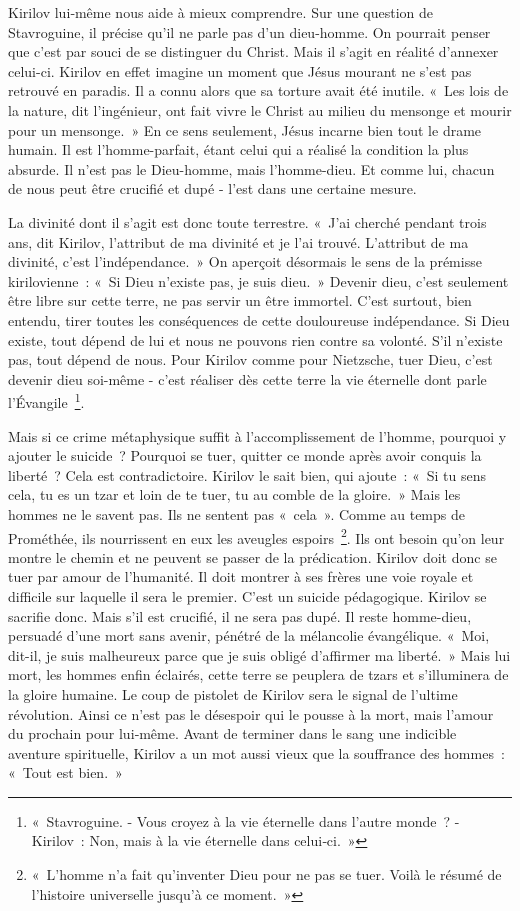 \documentclass{book}
\begin{document}
Kirilov lui‑même nous aide à mieux comprendre. Sur une question de Stavroguine, il précise qu'il ne parle pas d'un dieu-homme. On pourrait penser que c'est par souci de se distinguer du Christ. Mais il s'agit en réalité d'annexer celui-ci. Kirilov en effet imagine un moment que Jésus mourant ne s'est pas retrouvé en paradis. Il a connu alors que sa torture avait été inutile. « Les lois de la nature, dit l'ingénieur, ont fait vivre le Christ au milieu du mensonge et mourir pour un mensonge. » En ce sens seulement, Jésus incarne bien tout le drame humain. Il est l'homme-parfait, étant celui qui a réalisé la condition la plus absurde. Il n'est pas le Dieu-homme, mais l'homme-dieu. Et comme lui, chacun de nous peut être crucifié et dupé - l'est dans une certaine mesure.

La divinité dont il s'agit est donc toute terrestre. « J'ai cherché pendant trois ans, dit Kirilov, l'attribut de ma divinité et je l'ai trouvé. L'attribut de ma divinité, c'est l'indépendance. » On aperçoit désormais le sens de la prémisse kirilovienne : « Si Dieu n'existe pas, je suis dieu. » Devenir dieu, c'est seulement être libre sur cette terre, ne pas servir un être immortel. C'est surtout, bien entendu, tirer toutes les conséquences de cette douloureuse indépendance. Si Dieu existe, tout dépend de lui et nous ne pouvons rien contre sa volonté. S'il n'existe pas, tout dépend de nous. Pour Kirilov comme pour Nietzsche, tuer Dieu, c'est devenir dieu soi-même - c'est réaliser dès cette terre la vie éternelle dont parle l'Évangile \footnote{« Stavroguine. - Vous croyez à la vie éternelle dans l'autre monde ? - Kirilov : Non, mais à la vie éternelle dans celui‑ci. »}.

Mais si ce crime métaphysique suffit à l'accomplissement de l'homme, pourquoi y ajouter le suicide ? Pourquoi se tuer, quitter ce monde après avoir conquis la liberté ? Cela est contradictoire. Kirilov le sait bien, qui ajoute : « Si tu sens cela, tu es un tzar et loin de te tuer, tu au comble de la gloire. » Mais les hommes ne le savent pas. Ils ne sentent pas « cela ». Comme au temps de Prométhée, ils nourrissent en eux les aveugles espoirs \footnote{« L'homme n'a fait qu'inventer Dieu pour ne pas se tuer. Voilà le résumé de l'histoire universelle jusqu'à ce moment. »}. Ils ont besoin qu'on leur montre le chemin et ne peuvent se passer de la prédication. Kirilov doit donc se tuer par amour de l'humanité. Il doit montrer à ses frères une voie royale et difficile sur laquelle il sera le premier. C'est un suicide pédagogique. Kirilov se sacrifie donc. Mais s'il est crucifié, il ne sera pas dupé. Il reste homme-dieu, persuadé d'une mort sans avenir, pénétré de la mélancolie évangélique. « Moi, dit-il, je suis malheureux parce que je suis obligé d'affirmer ma liberté. » Mais lui mort, les hommes enfin éclairés, cette terre se peuplera de tzars et s'illuminera de la gloire humaine. Le coup de pistolet de Kirilov sera le signal de l'ultime révolution. Ainsi ce n'est pas le désespoir qui le pousse à la mort, mais l'amour du prochain pour lui‑même. Avant de terminer dans le sang une indicible aventure spirituelle, Kirilov a un mot aussi vieux que la souffrance des hommes : « Tout est bien. »
\end{document}
